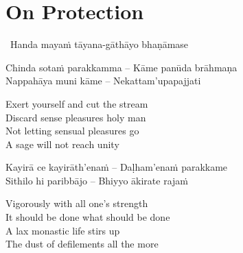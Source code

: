 
\section{On Protection}
\label{protection}

\begin{leader}
  \anglebracketleft\ \hspace{-0.5mm}Handa mayaṁ tāyana-gāthāyo bhaṇāmase \hspace{-0.5mm}\anglebracketright\
\end{leader}

\begin{verses}
  Chinda sotaṁ parakkamma – Kāme panūda brāhmaṇa\\
  Nappahāya muni kāme – Nekattam'upapajjati
\end{verses}

\begin{english-verses}
  Exert yourself and cut the stream\\
  Discard sense pleasures holy man\\
  Not letting sensual pleasures go\\
  A sage will not reach unity\makeatletter\hyperlink{endnote40-appendix}\makeatother
\end{english-verses}

\begin{verses}
  Kayirā ce kayirāth'enaṁ – Daḷham'enaṁ parakkame\\
  Sithilo hi paribbājo – Bhiyyo ākirate rajaṁ
\end{verses}

\begin{english-verses}
  Vigorously with all one's strength\\
  It should be done what should be done\\
  A lax monastic life stirs up\\
  The dust of defilements all the more\makeatletter\hyperlink{endnote41-appendix}\makeatother
\end{english-verses}

